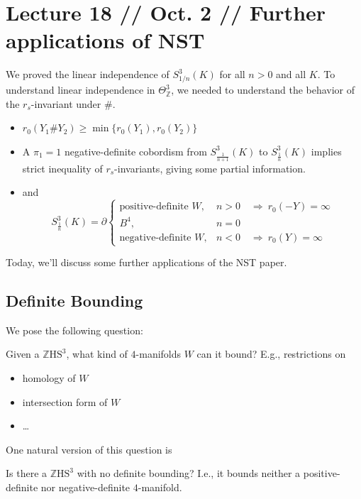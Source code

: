 \documentclass[main]{subfiles}
\begin{document}
\section*{Lecture 18 // Oct. 2 // Further applications of NST}

\begin{recall}
We proved the linear independence of $S^3_{1/n}(K)$ for all $n>0$ and all $K$. To understand linear independence in $\Theta^3_{\mathbb{Z}}$, we needed to understand the behavior of the $r_s$-invariant under $\#$.
\begin{itemize}
\item $r_0(Y_1\#Y_2)\geq\min\{r_0(Y_1),r_0(Y_2)\}$
\item A $\pi_1=1$ negative-definite cobordism from $S^3_{\frac{1}{n+1}}(K)$ to $S^3_{\frac{1}{n}}(K)$ implies strict inequality of $r_s$-invariants, giving some partial information.
\item and
\[
S^3_{\frac{1}{n}}(K)=\partial\begin{cases}\text{positive-definite } W, & n>0 \quad\Rightarrow\ r_0(-Y)=\infty\\ B^4, & n=0\\ \text{negative-definite } W, & n<0 \quad\Rightarrow\ r_0(Y)=\infty\end{cases}
\]
\end{itemize}
\end{recall}

Today, we'll discuss some further applications of the NST paper.

\subsection*{Definite Bounding}

We pose the following question:
\begin{question}
Given a $\mathbb{Z}\mathrm{HS}^3$, what kind of $4$-manifolds $W$ can it bound? E.g., restrictions on
\begin{itemize}
\item homology of $W$
\item intersection form of $W$
\item \dots
\end{itemize}
\end{question}

One natural version of this question is
\begin{question}
Is there a $\mathbb{Z}\mathrm{HS}^3$ with no definite bounding? I.e., it bounds neither a positive-definite nor negative-definite $4$-manifold.
\end{question}
\end{document}
